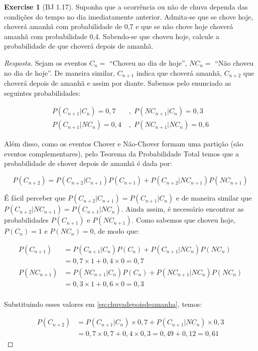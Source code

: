 \documentclass[
]{article}
\theoremstyle{definition}
\theoremstyle{definition}
\theoremstyle{definition}
\newtheorem{exercise}{Exercise}[section]
\theoremstyle{definition}
\theoremstyle{remark}
\begin{document}
\begin{exercise}[BJ 1.17]

Suponha que a ocorrência ou não de chuva dependa das condições do tempo no dia imediatamente anterior. Admita-se que se chove hoje, choverá amanhã com probabilidade de 0,7 e que se não chove hoje choverá amanhã com probabilidade 0,4. Sabendo-se que choveu hoje, calcule a probabilidade de que choverá depois de amanhã.

\begin{proof}[Resposta]
Sejam os eventos \(C_{n} =\) ``Choveu no dia de hoje'', \(NC_{n} =\) ``Não choveu no dia de hoje''. De maneira similar, \(C_{n+1}\) indica que choverá amanhã, \(C_{n+2}\) que choverá depois de amanhã e assim por diante. Sabemos pelo enunciado as seguintes probabilidades:

\begin{align*}
P(C_{n+1}|C_{n}) = 0,7 \; &, \; P(NC_{n+1}|C_{n}) = 0,3 \\
P(C_{n+1}|NC_{n}) = 0,4 \; &, \; P(NC_{n+1}|NC_{n}) = 0,6
\end{align*}

Além disso, como os eventos Chover e Não-Chover formam uma partição (são eventos complementares), pelo Teorema da Probabilidade Total temos que a probabilidade de chover depois de amanhã é dada por:

\begin{equation}
P(C_{n+2}) = P(C_{n+2}|C_{n+1})P(C_{n+1}) + P(C_{n+2}|NC_{n+1})P(NC_{n+1})
\label{eq:chuvadepoisdeamanha}
\end{equation}

É fácil perceber que \(P(C_{n+2}|C_{n+1}) = P(C_{n+1}|C_{n})\) e de maneira similar que \(P(C_{n+2}|NC_{n+1}) = P(C_{n+1}|NC_{n})\). Ainda assim, é necessário encontrar as probabilidades \(P(C_{n+1})\) e \(P(NC_{n+1})\). Como sabemos que choveu hoje, \(P(C_{n}) = 1\) e \(P(NC_{n}) = 0\), de modo que:

\begin{align*}
P(C_{n+1}) &= P(C_{n+1}|C_{n})P(C_{n}) + P(C_{n+1}|NC_{n})P(NC_{n}) \\
&= 0,7 \times 1 + 0,4 \times 0 = 0,7 \\
P(NC_{n+1}) &= P(NC_{n+1}|C_{n})P(C_{n}) + P(NC_{n+1}|NC_{n})P(NC_{n}) \\
&= 0,3 \times 1 + 0,6 \times 0 = 0,3 \\
\end{align*}

Substituindo esses valores em \eqref{eq:chuvadepoisdeamanha}, temos:

\begin{align*}
P(C_{n+2}) &= P(C_{n+1}|C_{n}) \times 0,7 + P(C_{n+1}|NC_{n}) \times 0,3 \\
&= 0,7 \times 0,7 + 0,4 \times 0,3 = 0,49 + 0,12 = 0,61
\end{align*}
\end{proof}

\end{exercise}
\end{document}

